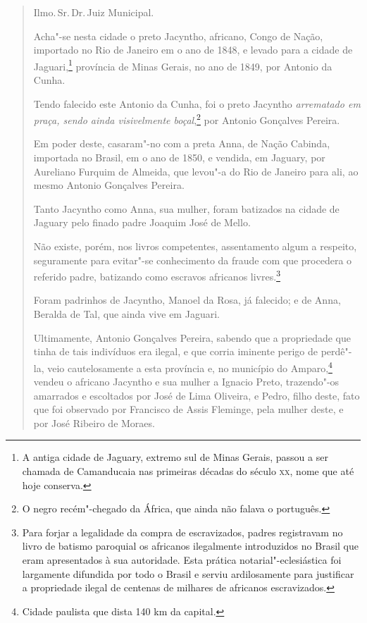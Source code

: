 \begin{quote}
Ilmo.\,Sr.\,Dr.\,Juiz Municipal.

Acha"-se nesta cidade o preto Jacyntho, africano, Congo de Nação,
importado no Rio de Janeiro em o ano de 1848, e levado para a cidade de
Jaguari,\footnote{A antiga cidade de Jaguary, extremo sul de Minas
  Gerais, passou a ser chamada de Camanducaia nas primeiras décadas do
  século \textsc{xx}, nome que até hoje conserva.} província de Minas Gerais, no
ano de 1849, por Antonio da Cunha.

Tendo falecido este Antonio da Cunha, foi o preto Jacyntho
\emph{arrematado em praça, sendo ainda visivelmente boçal},\footnote{O
  negro recém"-chegado da África, que ainda não falava o português.} por
Antonio Gonçalves Pereira.

Em poder deste, casaram"-no com a preta Anna, de Nação Cabinda, importada
no Brasil, em o ano de 1850, e vendida, em Jaguary, por Aureliano
Furquim de Almeida, que levou"-a do Rio de Janeiro para ali, ao mesmo
Antonio Gonçalves Pereira.

Tanto Jacyntho como Anna, sua mulher, foram batizados na cidade de
Jaguary pelo finado padre Joaquim José de Mello.

Não existe, porém, nos livros competentes, assentamento algum a
respeito, seguramente para evitar"-se conhecimento da fraude com que
procedera o referido padre, batizando como escravos africanos
livres.\footnote{Para forjar a legalidade da compra de escravizados,
  padres registravam no livro de batismo paroquial os africanos
  ilegalmente introduzidos no Brasil que eram apresentados à sua
  autoridade. Esta prática notarial"-eclesiástica foi largamente
  difundida por todo o Brasil e serviu ardilosamente para justificar a
  propriedade ilegal de centenas de milhares de africanos escravizados.}

Foram padrinhos de Jacyntho, Manoel da Rosa, já falecido; e de Anna,
Beralda de Tal, que ainda vive em Jaguari.

Ultimamente, Antonio Gonçalves Pereira, sabendo que a propriedade que
tinha de tais indivíduos era ilegal, e que corria iminente perigo de
perdê"-la, veio cautelosamente a esta província e, no município do
Amparo,\footnote{Cidade paulista que dista 140 km da capital.} vendeu
o africano Jacyntho e sua mulher a Ignacio Preto, trazendo"-os amarrados
e escoltados por José de Lima Oliveira, e Pedro, filho deste, fato que
foi observado por Francisco de Assis Fleminge, pela mulher deste, e por
José Ribeiro de Moraes.


\end{quote}
